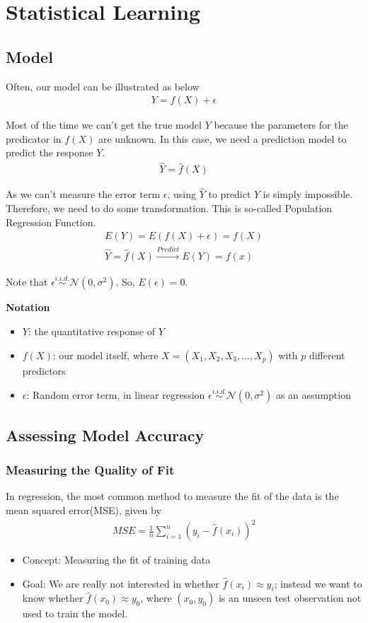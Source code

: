    \documentclass[12pt,fleqn,a4paper]{article}
\theoremstyle{definition}
\theoremstyle{plain}
\begin{document}
\section{Statistical Learning}
\subsection{\textbf{Model}}
Often, our model can be illustrated as below
\begin{gather}
Y = f(X) + \epsilon
\end{gather}

Most of the time we can't get the true model $Y$ because the parameters for the predicator in $f(X)$ are unknown.
In this case, we need a prediction model to predict the response $Y$.
\begin{gather}
\hat{Y} = \hat{f}(X)
\end{gather}

As we can't measure the error term $\epsilon$, using $\hat{Y}$ to predict $Y$ is simply impossible.
Therefore, we need to do some transformation. This is so-called Population Regression Function.
\begin{gather}
E(Y) = E(f(X) + \epsilon) = f(X) \\
\hat{Y} = \hat{f}(X) \stackrel{Predict}{\longrightarrow} E(Y)=f(x)
\end{gather}

Note that $\epsilon \stackrel{i.i.d.}{\sim} \mathcal{N}(0,\sigma^{2}) $. So, $E(\epsilon)=0$.

\textbf{Notation}
\begin{itemize}
\item $Y$: the quantitative response of $Y$
\item $f(X)$: our model itself, where $X = (X_{1},X_{2},X_{3},\dots,X_{p})$ with $p$ different predictors
\item $\epsilon$: Random error term, in linear regression $\epsilon \stackrel{i.i.d.}{\sim} \mathcal{N}(0,\sigma^{2}) $ as an assumption
\end{itemize}


\subsection{\textbf{Assessing Model Accuracy}}
\subsubsection{\textbf{Measuring the Quality of Fit}}
In regression, the most common method to measure the fit of the data is the mean squared error(MSE), given by
\begin{gather}
MSE = \frac{1}{n}\sum\limits_{i=1}^{n}(y_{i}-\hat{f}(x_{i}))^2
\end{gather}
\begin{itemize}
\item Concept: Measuring the fit of training data
\item Goal: We are really not interested in whether $\hat{f}(x_{i}) \approx  y_{i}$; instead we want to know whether $\hat{f}(x_{0}) \approx y_{0}$, where $(x_{0},y_{0})$ is an unseen test observation not used to train the model.
\end{itemize}
\end{document}
